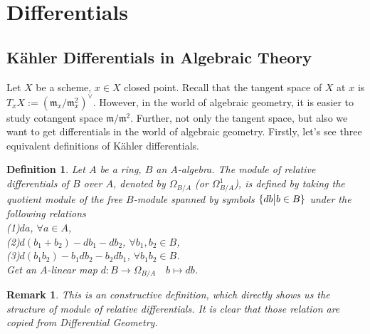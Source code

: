 \documentclass{ctexart}
\newtheorem{definition}{Definition}[section]
\newtheorem{remark}{Remark}[section]
\begin{document}
\section{Differentials}
\label{section:Differentials}

\subsection{Kähler Differentials in Algebraic Theory}
Let $X$ be a scheme, $x\in X$ closed point.
Recall that the tangent space of $X$ at $x$ is $T_{x}X := (\mathfrak{m}_{x}/\mathfrak{m}_{x}^{2})^{\lor}$.
However, in the world of algebraic geometry, it is easier to study cotangent space $\mathfrak{m}/\mathfrak{m}^{2}$.
Further, not only the tangent space, but also we want to get differentials in the world of algebraic geometry. 
Firstly, let's see three equivalent definitions of Kähler differentials.
\begin{definition}
    Let $A$ be a ring, $B$ an $A$-algebra.
    The module of relative differentials of $B$ over $A$, denoted by $\Omega_{B/A}$ (or $\Omega_{B/A}^{1}$),
    is defined by taking the quotient module of the free $B$-module spanned by symbols $\{db \big{|} b\in B\}$ under the following relations \\
    (1)$da$, $\forall a\in A$, \\
    (2)$d(b_{1} + b_{2}) - db_{1} - db_{2}$, $\forall b_{1},b_{2}\in B$, \\
    (3)$d(b_{1}b_{2}) - b_{1}db_{2} - b_{2}db_{1}$, $\forall b_{1}b_{2}\in B$. \\
    Get an $A$-linear map $d: B \longrightarrow \Omega_{B/A}\quad b \longmapsto db$.
\end{definition}
\begin{remark}
    This is an constructive definition, which directly shows us the structure of module of relative differentials.
    It is clear that those relation are copied from Differential Geometry.
\end{remark}
\end{document}
